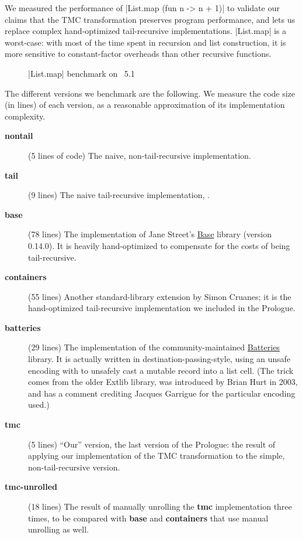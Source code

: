 We measured the performance of \ocaml|List.map (fun n -> n + 1)| to validate our claims that the TMC transformation preserves program performance, and lets us replace complex hand-optimized tail-recursive implementations. \ocaml|List.map| is a worst-case: with most of the time spent in recursion and list construction, it is more sensitive to constant-factor overheads than other recursive functions.

\begin{figure}[tp]
\def\svgscale{0.8}
\graphicspath{{plots/}}

\caption{\ocaml|List.map| benchmark on \OCaml~5.1}
\label{fig:bench5}
\end{figure}

\newcommand{\bench}[1]{\textbf{#1}}

The different versions we benchmark are the following. We measure the code size (in lines) of each version, as a reasonable approximation of its implementation complexity.
\begin{description}
\item[\bench{nontail}] (5 lines of code) The naive, non-tail-recursive implementation.
\item[\bench{tail}] (9 lines) The naive tail-recursive implementation,
  .
\item[\bench{base}] (78 lines) The implementation of Jane Street's
  \href{https://github.com/janestreet/base}{Base} library
  (version 0.14.0). It is heavily hand-optimized to compensate for the costs
  of being tail-recursive.
\item[\bench{containers}] (55 lines) Another standard-library extension by Simon
  Cruanes; it is the hand-optimized tail-recursive implementation we
  included in the Prologue.
\item[\bench{batteries}] (29 lines) The implementation of the community-maintained
  \href{https://github.com/ocaml-batteries-team/batteries-included/}{Batteries}
  library. It is actually written in destination-passing-style, using
  an unsafe encoding with  to unsafely cast a mutable
  record into a list cell. (The trick comes from the older Extlib
  library, was introduced by Brian Hurt in 2003, and has a comment crediting Jacques
  Garrigue for the particular encoding used.)
\item[\bench{tmc}] (5 lines) ``Our'' version, the last version of the Prologue: the
  result of applying our implementation of the TMC transformation to
  the simple, non-tail-recursive version.
\item[\bench{tmc-unrolled}] (18 lines) The result of manually unrolling the \bench{tmc} implementation three times, to be compared with \bench{base} and \bench{containers} that use manual unrolling as well.
\end{description}

